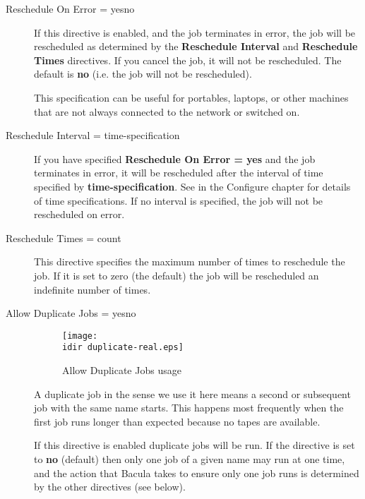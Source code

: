 \begin{description}
\item [Reschedule On Error = \lt{}yes\vb{}no\gt{}]
   If this directive is enabled, and the job terminates in error, the job
   will be rescheduled as determined by the {\bf Reschedule Interval} and
   {\bf Reschedule Times} directives.  If you cancel the job, it will not
   be rescheduled.  The default is {\bf no} (i.e.  the job will not be
   rescheduled).

   This specification can be useful for portables, laptops, or other
   machines that are not always connected to the network or switched on.

\item [Reschedule Interval = \lt{}time-specification\gt{}]
   If you have specified {\bf Reschedule On Error = yes} and the job
   terminates in error, it will be rescheduled after the interval of time
   specified by {\bf time-specification}.  See  in the Configure chapter for details of
   time specifications.  If no interval is specified, the job will not be
   rescheduled on error.

\item [Reschedule Times = \lt{}count\gt{}]
   This directive specifies the maximum number of times to reschedule the
   job.  If it is set to zero (the default) the job will be rescheduled an
   indefinite number of times.

\item [Allow Duplicate Jobs = \lt{}yes\vb{}no\gt{}]

\begin{figure}[htbp]
  \centering
  \texttt{[image: \\idir duplicate-real.eps]}
  \caption{Allow Duplicate Jobs usage}
  \label{fig:allowduplicatejobs}
\end{figure}

A duplicate job in the sense we use it here means a second or subsequent job
with the same name starts.  This happens most frequently when the first job
runs longer than expected because no tapes are available.

  If this directive is enabled duplicate jobs will be run.  If
  the directive is set to {\bf no} (default) then only one job of a given name
  may run at one time, and the action that Bacula takes to ensure only
  one job runs is determined by the other directives (see below).
 

\end{description}
